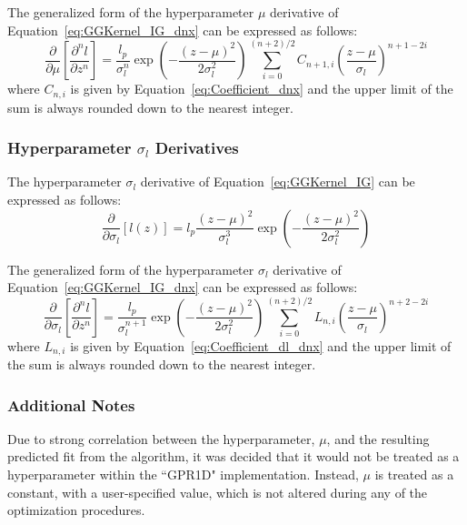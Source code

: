 \documentclass{article}
\begin{document}
The generalized form of the hyperparameter $\mu$ derivative of Equation~\eqref{eq:GGKernel_IG_dnx} can be expressed as follows:
\begin{equation}
\label{eq:GGKernel_IG_dm_dnx}
	\frac{\partial}{\partial \mu}\!\left[\frac{\partial^n l}{\partial z^n}\right] = \frac{l_p}{\sigma_l^n} \exp{\left(-\frac{\left(z - \mu\right)^2}{2 \sigma_l^2}\right)} \sum_{i=0}^{\left(n+2\right)/2} C_{n+1,i} \left(\frac{z - \mu}{\sigma_l}\right)^{n+1-2i}
\end{equation}
where $C_{n,i}$ is given by Equation~\eqref{eq:Coefficient_dnx} and the upper limit of the sum is always rounded down to the nearest integer.

\subsubsection{Hyperparameter $\sigma_l$ Derivatives}
\label{subsubsec:GG_IGHypeDer_s}

The hyperparameter $\sigma_l$ derivative of Equation~\eqref{eq:GGKernel_IG} can be expressed as follows:
\begin{equation}
\label{eq:GGKernel_IG_ds}
	\frac{\partial}{\partial \sigma_l}\!\left[l\!\left(z\right)\right] = l_p \frac{\left(z - \mu\right)^2}{\sigma_l^3} \exp{\left(-\frac{\left(z - \mu\right)^2}{2 \sigma_l^2}\right)}
\end{equation}

The generalized form of the hyperparameter $\sigma_l$ derivative of Equation~\eqref{eq:GGKernel_IG_dnx} can be expressed as follows:
\begin{equation}
\label{eq:GGKernel_IG_ds_dnx}
	\frac{\partial}{\partial \sigma_l}\!\left[\frac{\partial^n l}{\partial z^n}\right] = \frac{l_p}{\sigma_l^{n+1}} \exp{\left(-\frac{\left(z - \mu\right)^2}{2 \sigma_l^2}\right)} \sum_{i=0}^{\left(n+2\right)/2} L_{n,i} \left(\frac{z - \mu}{\sigma_l}\right)^{n+2-2i}
\end{equation}
where $L_{n,i}$ is given by Equation~\eqref{eq:Coefficient_dl_dnx} and the upper limit of the sum is always rounded down to the nearest integer.

\subsubsection{Additional Notes}
\label{subsubsec:GG_IGNotes}

Due to strong correlation between the hyperparameter, $\mu$, and the resulting predicted fit from the algorithm, it was decided that it would not be treated as a hyperparameter within the ``GPR1D" implementation. Instead, $\mu$ is treated as a constant, with a user-specified value, which is not altered during any of the optimization procedures.

\printbibliography
\end{document}
